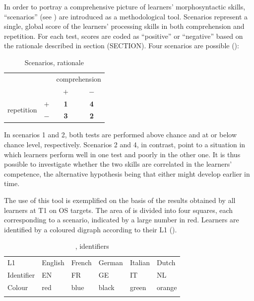 In order to portray a comprehensive picture of learners’ morphosyntactic skills, “scenarios” (see ) are introduced as a methodological tool. Scenarios represent a single, global score of the learners' processing skills in both comprehension and repetition. For each test, scores are coded as ``positive'' or ``negative'' based on the rationale described in section (SECTION). Four scenarios are possible ():
\begin{table}
    \begin{tabular}{|lc|cc|}
    \hline
    & & \multicolumn{2}{c|}{ comprehension}\\
    &  & $+$ & $-$\\
    \hline
     \multirow{2}{*}{repetition} & $+$ & \textbf{1} & \textbf{4}\\
                                & $-$ & \textbf{3} & \textbf{2}\\
    \hline
    \end{tabular}
    \caption{Scenarios, rationale}
    \label{tab:06:2}
\end{table}

In scenarios 1 and 2, both tests are performed above chance and at or below chance level, respectively. Scenarios 2 and 4, in contrast, point to a situation in which learners perform well in one test and poorly in the other one. It is thus possible to investigate whether the two skills are correlated in the learners' competence, the alternative hypothesis being that either might develop earlier in time.

The use of this tool is exemplified on the basis of the results obtained by all learners at T1 on OS targets. The area of  is divided into four squares, each corresponding to a scenario, indicated by a large number in red. Learners are identified by a coloured digraph according to their L1 ().

\begin{table}
    \begin{tabularx}{\textwidth}{XXXXXX}
    \lsptoprule
    L1 & English & French & German & Italian & Dutch\\
    Identifier & EN & FR & GE & IT & NL\\
    Colour & red & blue & black & green & orange\\
    \lspbottomrule
    \end{tabularx}
    \caption{, identifiers}
    \label{tab:06:3}
\end{table}

